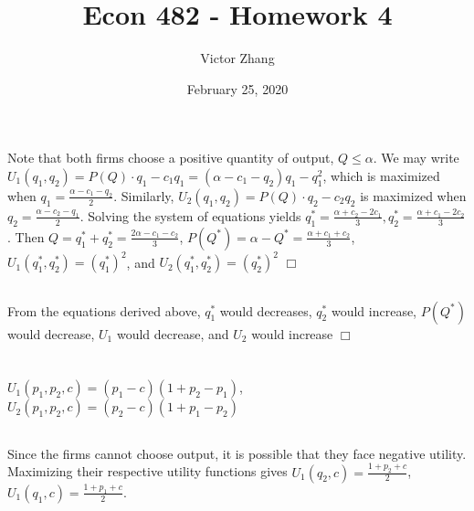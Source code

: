 \documentclass{article}
\title{Econ 482 - Homework 4}
\author{Victor Zhang}
\date{February 25, 2020}
\begin{document}
\maketitle

\section{}
\subsection{}
Note that both firms choose a positive quantity of output, $Q \leq \alpha$. We may write $U_1(q_1,q_2) = P(Q)\cdot q_1 - c_1q_1 = (\alpha - c_1 - q_2)q_1 - q_1^2$, which is maximized when $q_1 = \frac{\alpha - c_1 - q_2}{2}$. Similarly, $U_2(q_1,q_2) = P(Q)\cdot q_2 - c_2q_2$ is maximized when $q_2 = \frac{\alpha - c_2 - q_1}{2}$. Solving the system of equations yields $q_1^* = \frac{\alpha + c_2 - 2c_1}{3}, q_2^* = \frac{\alpha + c_1 - 2c_2}{3}$. Then $Q = q_1^* + q_2^* = \frac{2\alpha - c_1 - c_2}{3}$, $P(Q^*) = \alpha - Q^* = \frac{\alpha + c_1 + c_2}{3}$, $U_1(q_1^*,q_2^*) = \left(q_1^*\right)^2$, and $U_2(q_1^*,q_2^*) = \left(q_2^*\right)^2$ $\Box$

\subsection{}
From the equations derived above, $q_1^*$ would decreases, $q_2^*$ would increase, $P(Q^*)$ would decrease, $U_1$ would decrease, and $U_2$ would increase $\Box$

\section{}
\subsection{}
$U_1(p_1,p_2,c) = (p_1-c)(1+p_2-p_1)$, $U_2(p_1,p_2,c) = (p_2-c)(1+p_1-p_2)$
\subsection{}
Since the firms cannot choose output, it is possible that they face negative utility. Maximizing their respective utility functions gives $U_1(q_2,c) = \frac{1+p_2+c}{2}$, $U_1(q_1,c) = \frac{1+p_1+c}{2}$.
\end{document}
